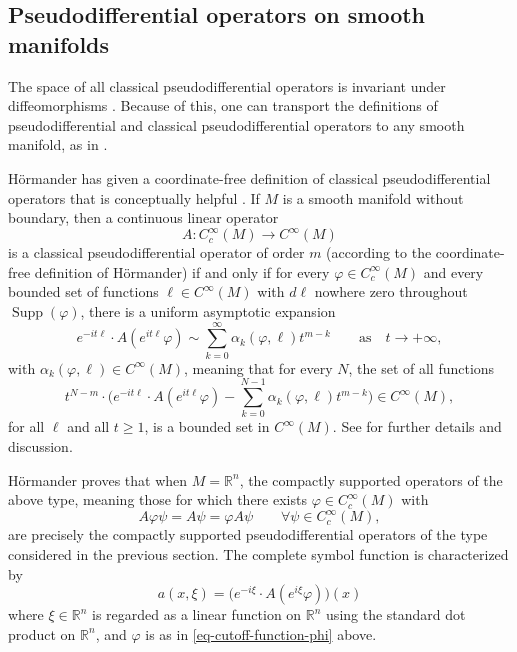 \documentclass[leqno,11pt]{amsart}
\numberwithin{equation}{subsection}
\theoremstyle{plain}
\theoremstyle{definition}
\theoremstyle{remark}
\newcommand{\R}{\mathbb{R}}
\DeclareMathOperator{\Supp}{Supp}
\begin{document}
\subsection{Pseudodifferential operators on smooth manifolds} 
\label{sec-psdos-on-manifolds}
The space of all classical pseudodifferential operators is  invariant under  diffeomorphisms \cite[Thm.~18.1.17]{HormanderVolIII}. Because of this, one can transport the definitions of  pseudodifferential and classical pseudodifferential operators to any smooth manifold, as in  \cite[Def.~18.1.20]{HormanderVolIII}.  

H\"ormander has given  a coordinate-free definition of classical pseudodifferential operators that is conceptually  helpful \cite{Hormander65}.  If $M$ is a smooth manifold without boundary, then a continuous linear operator
\[
A \colon C_c^\infty (M) \longrightarrow C^\infty (M)
\]
is a classical pseudodifferential operator of order $m$ (according to the  coor\-dinate-free definition of  H\"ormander) if and only if for every $\varphi \in C_c^\infty (M) $ and every bounded set of functions $\ell \in C^\infty (M)$ with $d\ell$ nowhere zero throughout $\Supp(\varphi)$, there is a uniform  asymptotic expansion
\begin{equation}
    \label{eq-coordinate-free-asymptotic-expansion}
e^{-i t \ell } \cdot A(e^{i t\ell }\varphi )
\sim 
\sum_{k=0}^\infty \alpha_k(\varphi ,\ell ) t ^{m-k}\qquad\text{as}\quad  t \to +\infty,
\end{equation}
with $\alpha_k(\varphi ,\ell )\in C^\infty (M)$, meaning that for every $N$,  the set of all  functions 
\begin{equation}
    \label{eq-coordinate-free-asymptotic-expansion-uniformity-condition}
t ^{N-m}\cdot \bigl (
e^{-i t \ell } \cdot A(e^{i t\ell }\varphi )
-  \sum_{k=0}^{N-1} \alpha_k(\varphi ,\ell ) t ^{m-k}\bigr ) \in C^\infty(M),
\end{equation}
for all $\ell $ and all $t \ge 1$, is a bounded set in $C^\infty (M)$.  See \cite[Sec.\ 2]{Hormander65} for further details and discussion.

H\"ormander proves that when $M {=} \R^n$, the compactly supported operators of the above type, meaning those for which there exists $\varphi  \in C_c^\infty(M)$ with 
\begin{equation}
    \label{eq-cutoff-function-phi}
A \varphi\psi   = A\psi = \varphi  A\psi\qquad \forall \psi \in C^\infty _c(M)    ,
\end{equation}
are precisely the compactly supported pseudodifferential operators of the type considered in the previous section. The complete symbol function is characterized by 
\[
a(x,\xi) = \bigl ( e^{-i \xi } \cdot A( e^{i\xi}\varphi )\bigr ) (x) 
\]
where $\xi\in \R^n$ is regarded as a linear function on $\R^n$ using the standard dot product on $\R^n$, and $\varphi$ is as in \eqref{eq-cutoff-function-phi} above. 
\end{document}
